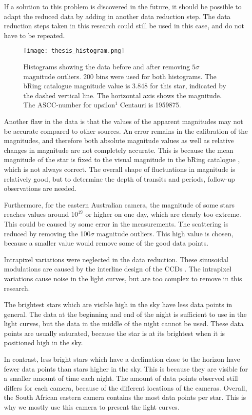\documentclass{aa}
\begin{document}
If a solution to this problem is discovered in the future, it should be possible to adapt the reduced data by adding in another data reduction step. The data reduction steps taken in this research could still be used in this case, and do not have to be repeated.
\begin{figure}
    \centering
    \texttt{[image: thesis\_histogram.png]}
    \caption{Histograms showing the data before and after removing $5\sigma$ magnitude outliers. 200 bins were used for both histograms. The bRing catalogue magnitude value is 3.848 for this star, indicated by the dashed vertical line. The horizontal axis shows the magnitude. The ASCC-number for upsilon$^1$ Centauri is 1959875.}
    \label{hist}
\end{figure}
Another flaw in the data is that the values of the apparent magnitudes may not be accurate compared to other sources. An error remains in the calibration of the magnitudes, and therefore both absolute magnitude values as well as relative changes in magnitude are not completely accurate.
This is because the mean magnitude of the star is fixed to the visual magnitude in the bRing catalogue \citep{Talens_2018}, which is not always correct. The overall shape of fluctuations in magnitude is relatively good, but to determine the depth of transits and periods, follow-up observations are needed.

Furthermore, for the eastern Australian camera, the magnitude of some stars reaches values around $10^{19}$ or higher on one day, which are clearly too extreme. This could be caused by some error in the measurements. The scattering is reduced by removing the 100$\sigma$ magnitude outliers. This high value is chosen, because a smaller value would remove some of the good data points. 

Intrapixel variations were neglected in the data reduction. These sinusoidal modulations are caused by the interline design of the CCDs \citep{Talens_2018}. The intrapixel variations cause noise in the light curves, but are too complex to remove in this research.

The brightest stars which are visible high in the sky have less data points in general. The data at the beginning and end of the night is sufficient to use in the light curves, but the data in the middle of the night cannot be used. These data points are usually saturated, because the star is at its brightest when it is positioned high in the sky.

In contrast, less bright stars which have a declination close to the horizon have fewer data points than stars higher in the sky. This is because they are visible for a smaller amount of time each night. The amount of data points observed still differs for each camera, because of the different locations of the cameras. Overall, the South African eastern camera contains the most data points per star. This is why we mostly use this camera to present the light curves.
\end{document}
